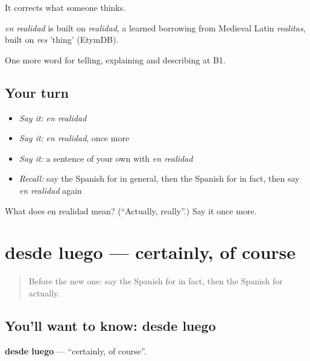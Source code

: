 It corrects what someone thinks.

\begin{cousinweb}
\emph{en realidad} is built on \emph{realidad}, a learned borrowing from Medieval Latin \emph{realitas}, built on \emph{res} 'thing' (EtymDB).
\end{cousinweb}

\begin{grammarlens}[title={What you've built}]
One more word for telling, explaining and describing at B1.
\end{grammarlens}

\subsection*{Your turn}
\begin{itemize}
\raggedright
  \item \emph{Say it:} \emph{en realidad}
  \item \emph{Say it:} \emph{en realidad}, once more
  \item \emph{Say it:} a sentence of your own with \emph{en realidad}
  \item \emph{Recall:} say the Spanish for in general, then the Spanish for in fact, then say \emph{en realidad} again
\end{itemize}

\begin{tcolorbox}[breakable,colback=teal!4,colframe=teal!35!black,title={Before you move on}]
What does en realidad mean? (\textquotedblleft{}Actually, really\textquotedblright{}.) Say it once more.
\end{tcolorbox}
\section[desde luego]{desde luego — certainly, of course}

\label{lesson:ES-C589-desde-luego}



\begin{quote}
Before the new one: say the Spanish for in fact, then the Spanish for actually.
\end{quote}

\subsection*{You'll want to know: desde luego}
\textbf{desde luego} — \textquotedblleft{}certainly, of course\textquotedblright{}.

